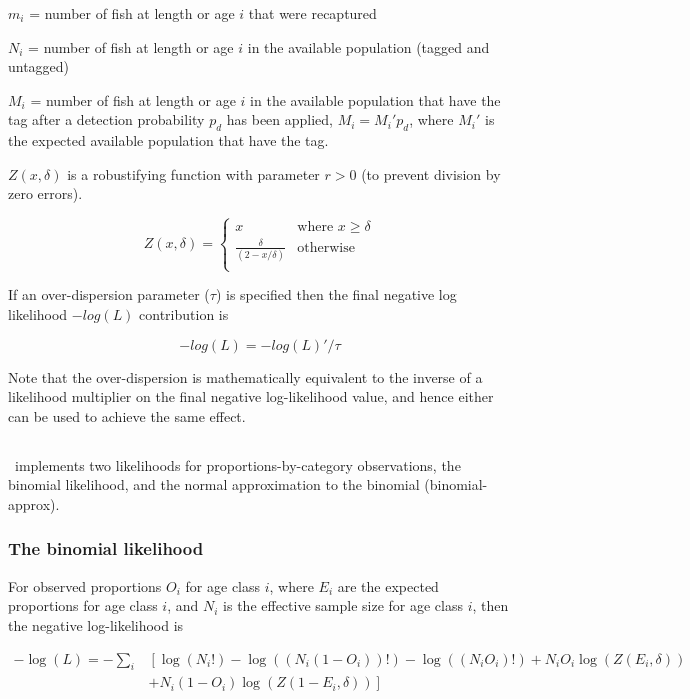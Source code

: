 $m_i$ = number of fish at length or age $i$ that were recaptured

$N_i$ = number of fish at length or age $i$ in the available population (tagged and untagged)

$M_i$ = number of fish at length or age $i$ in the available population that have the tag after a detection probability $p_d$ has been applied, $M_i = M_i'p_d$, where $M_i'$ is the expected available population that have the tag.

$Z(x,\delta)$ is a robustifying function with parameter $r > 0$ (to prevent division by zero errors).

\[ Z(x,\delta) =
\begin{cases}
x       & \text{where } x \geq \delta\\
\frac{\delta}{(2 - x / \delta)}  & \text{otherwise}\\
\end{cases}
\]

If an over-dispersion parameter ($\tau$) is specified then the final negative log likelihood $-log(L)$ contribution is

$$-log(L) = -log(L)' / \tau$$

Note that the over-dispersion is mathematically equivalent to the inverse of a likelihood multiplier on the final negative log-likelihood value, and hence either can be used to achieve the same effect. 

\subsection{}

\CNAME\ implements two likelihoods for proportions-by-category observations, the binomial likelihood, and the normal approximation to the binomial (binomial-approx).

\subsubsection{The binomial likelihood }

For observed proportions $O_i$ for age class $i$, where $E_i$ are the expected proportions for age class $i$, and $N_i$ is the effective sample size for age class $i$, then the negative log-likelihood is

\begin{equation}
	\begin{split}
	-\log \left(L \right)= -\sum\limits_i & \left[ \right. \log \left(N_i! \right) - \log \left(\left(N_i \left(1 - O_i \right) \right)! \right) - \log \left(\left(N_i O_i \right)! \right) + N_i O_i \log \left(Z\left(E_i,\delta \right) \right) \\
	&+ N_i \left(1 - O_i \right)\log \left(Z\left(1 - E_i,\delta\right) \right) \left. \right]
	\end{split}
\end{equation}


